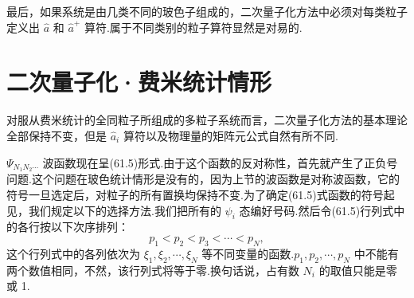 最后，如果系统是由几类不同的玻色子组成的，二次量子化方法中必须对每类粒子定义出 $\hat{a}$ 和 $\hat{a}^{+}$ 算符.属于不同类别的粒子算符显然是对易的.

\section{二次量子化·费米统计情形}

对服从费米统计的全同粒子所组成的多粒子系统而言，二次量子化方法的基本理论全部保持不变，但是 $\hat{a}_i$ 算符以及物理量的矩阵元公式自然有所不同.

$\boldsymbol{\varPsi}_{N_1N_2\cdots}$ 波函数现在呈(61.5)形式.由于这个函数的反对称性，首先就产生了正负号问题.这个问题在玻色统计情形是没有的，因为上节的波函数是对称波函数，它的符号一旦选定后，对粒子的所有置换均保持不变.为了确定(61.5)式函数的符号起见，我们规定以下的选择方法.我们把所有的 $\psi_i$ 态编好号码.然后令(61.5)行列式中的各行按以下次序排列：
\begin{equation}
  p_1<p_2<p_3<\cdots<p_N,
\end{equation}
这个行列式中的各列依次为 $\xi_1,\xi_2,\cdots,\xi_N$ 等不同变量的函数.$p_1,p_2,\cdots,p_N$ 中不能有两个数值相同，不然，该行列式将等于零.换句话说，占有数 $N_i$ 的取值只能是零或 1.

